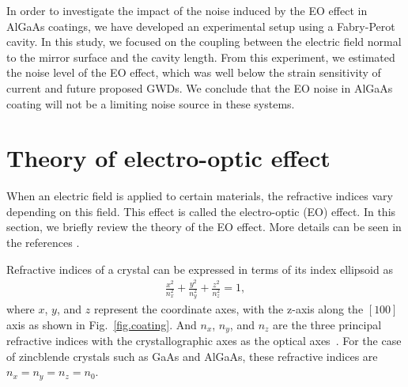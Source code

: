 \documentclass[%
 reprint,
 superscriptaddress,
 amsmath,amssymb,
 aps,
]{revtex4-2}
\begin{document}
In order to investigate the impact of the noise induced by the EO effect in AlGaAs coatings, we have developed an experimental setup using a Fabry-Perot cavity.
In this study, we focused on the coupling between the electric field normal to the mirror surface and the cavity length.
From this experiment, we estimated the noise level of the EO effect, which was well below the strain sensitivity of current and future proposed GWDs.
We conclude that the EO noise in AlGaAs coating will not be a limiting noise source in these systems.

\section{Theory of electro-optic effect}

When an electric field is applied to certain materials, the refractive indices vary depending on this field.
This effect is called the electro-optic (EO) effect.
In this section, we briefly review the theory of the EO effect.
More details can be seen in the references \cite{Namba1961,yariv}.

Refractive indices of a crystal can be expressed in terms of its index ellipsoid as
\begin{align}
    \frac{x^2}{n_x^2} + \frac{y^2}{n_y^2} + \frac{z^2}{n_z^2} = 1,
    \label{eq.index}
\end{align}
where $x$, $y$, and $z$ represent the coordinate axes, with the z-axis along the $[100]$ axis as shown in Fig.~\ref{fig.coating}.
And $n_x$, $n_y$, and $n_z$ are the three principal refractive indices with the crystallographic axes as the optical axes~\cite{yariv}.
For the case of zincblende crystals such as GaAs and AlGaAs, these refractive indices are $n_x=n_y=n_z=n_0$.
\end{document}
